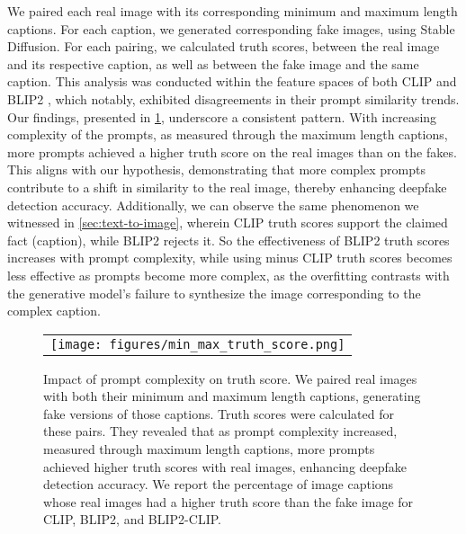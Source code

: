 \documentclass{article} \usepackage{iclr2024_conference,times}
\begin{document}
We paired each real image with its corresponding minimum and maximum length captions. For each caption, we generated corresponding fake images, using Stable Diffusion. For each pairing, we calculated truth scores, between the real image and its respective caption, as well as between the fake image and the same caption. This analysis was conducted within the feature spaces of both CLIP \citep{clip} and BLIP2 \citep{blip2}, which notably, exhibited disagreements in their prompt similarity trends. Our findings, presented in \cref{fig:cap_complex}, underscore a consistent pattern. With increasing complexity of the prompts, as measured through the maximum length captions, more prompts achieved a higher truth score on the real images than on the fakes. This aligns with our hypothesis, demonstrating that more complex prompts contribute to a shift in similarity to the real image, thereby enhancing deepfake detection accuracy. Additionally, we can observe the same phenomenon we witnessed in \cref{sec:text-to-image}, wherein CLIP truth scores support the claimed fact (caption), while BLIP2 rejects it. So the effectiveness of BLIP2 truth scores increases with prompt complexity, while using minus CLIP truth scores becomes less effective as prompts become more complex, as the overfitting contrasts with the generative model's failure to synthesize the image corresponding to the complex caption.


\begin{figure}[t]
  \begin{center}
    \begin{tabular}{c}
\texttt{[image: figures/min\_max\_truth\_score.png]} 
    \end{tabular}
  \end{center}
\caption{Impact of prompt complexity on truth score. We paired real images with both their minimum and maximum length captions, generating fake versions of those captions. Truth scores were calculated for these pairs. They revealed that as prompt complexity increased, measured through maximum length captions, more prompts achieved higher truth scores with real images, enhancing deepfake detection accuracy. We report the percentage of image captions whose real images had a higher truth score than the fake image for CLIP, BLIP2, and BLIP2-CLIP.}
    \label{fig:cap_complex}
\end{figure}
\end{document}
